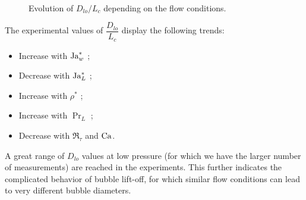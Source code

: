 \begin{figure}[h!]
\begin{center}
{\label{fig:dlo_prl}
}
\\

	\caption{Evolution of $D_{lo} / L_{c}$ depending on the flow conditions.} 	
	\label{fig:exp_dlo_trends}
\end{center}
\end{figure}

\npar


The experimental values of $\dfrac{D_{lo}}{L_{c}}$ display the following trends:

\begin{itemize}
\item Increase with $\mathrm{Ja}_{w}^{*}$ ;
\item Decrease with $\mathrm{Ja}_{L}^{*}$ ;
\item Increase with $\rho^{*}$ ;
\item Increase with $\Pr_{L}$ ;
\item Decrease with $\Re_{\tau}$ and $\mathrm{Ca}$.
\end{itemize}

A great range of $D_{lo}$ values at low pressure (for which we have the larger number of measurements) are reached in the experiments. This further indicates the complicated behavior of bubble lift-off, for which similar flow conditions can lead to very different bubble diameters.

